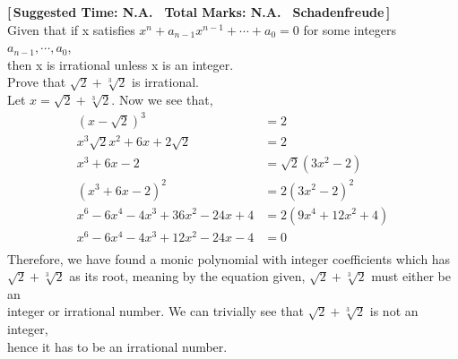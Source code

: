 \textbf{\hypertarget{P10}{[\,Suggested Time: N.A. \textbar \, Total Marks: N.A. \textbar \, Schadenfreude\,]}} \\
    Given that if x satisfies \(\displaystyle x^{n}+a_{n-1}x^{n-1}+\cdots+a_{0} = 0\) for some integers \(a_{n-1},\cdots, a_{0}\), \\
    then x is irrational unless x is an integer. \\
    Prove that \(\sqrt{2}+\sqrt[3]{2}\) is irrational. \\




    Let \(\displaystyle x = \sqrt{2}+\sqrt[3]{2}\). Now we see that,
    \begin{align*}
        \displaystyle       \left(x-\sqrt{2}\right)^{3} &= 2 \\
        \displaystyle   x^{3}\sqrt{2}x^{2}+6x+2\sqrt{2} &= 2 \\
        \displaystyle                        x^{3}+6x-2 &= \sqrt{2}\left(3x^{2}-2\right) \\
        \displaystyle       \left(x^{3}+6x-2\right)^{2} &= 2\left(3x^{2}-2\right)^{2} \\
        \displaystyle x^{6}-6x^{4}-4x^{3}+36x^{2}-24x+4 &= 2(9x^{4}+12x^{2}+4) \\
        \displaystyle x^{6}-6x^{4}-4x^{3}+12x^{2}-24x-4 &= 0 \\
    \end{align*}
    Therefore, we have found a monic polynomial with integer coefficients which has \\
    \(\displaystyle \sqrt{2}+\sqrt[3]{2}\) as its root, meaning by the equation given, \(\displaystyle \sqrt{2}+\sqrt[3]{2}\) must either be an \\
    integer or irrational number. We can trivially see that \(\displaystyle \sqrt{2}+\sqrt[3]{2}\) is not an integer, \\
    hence it has to be an irrational number.

    \newpage \ \newpage
